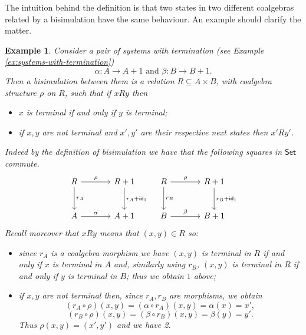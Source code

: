 \documentclass[letterpaper, 11pt, oneside]{memoir}
\theoremstyle{myteo}
\newtheorem{example}[theorem]{Example}
\numberwithin{equation}{section}
\newcommand{\id}{\textsf{id}}
\newcommand{\Set}{\textsf{Set}}
\begin{document}
The intuition behind the definition is that two states in two different coalgebras related by a bisimulation have the same behaviour.
An example should clarify the matter.
\begin{example}
  Consider a pair of systems with termination (see Example \ref{ex:systems-with-termination})
  \begin{equation*}
    \alpha: A \to A + 1 \text{ and } \beta: B \to B + 1.
  \end{equation*}
  Then a bisimulation between them is a relation \(R \subseteq A \times B\), with coalgebra structure \(\rho\) on \(R\), such that if \(x R y\) then
  \begin{itemize}
  \item[1.] \(x\) is terminal if and only if \(y\) is terminal;
  \item[2.] if \(x, y\) are not terminal and \(x', y'\) are their respective next states then \(x' R y'\).
  \end{itemize}
  Indeed by the definition of bisimulation we have that the following squares in \(\Set\) commute.
  \begin{equation}
    \label{dia:fooooo}
    \begin{tikzcd}[sep = large]
      R \ar[r, "\rho"] \ar[d, "r_A"] & R + 1 \ar[d, "r_A + \id_1"] \\
      A \ar[r, "\alpha"] & A + 1
    \end{tikzcd}\quad
    \begin{tikzcd}[sep = large]
      R \ar[r, "\rho"] \ar[d, "r_B"] & R + 1 \ar[d, "r_B + \id_1"] \\
      B \ar[r, "\beta"] & B + 1
    \end{tikzcd}
  \end{equation}
  Recall moreover that \(x R y\) means that \((x, y) \in R\) so:
  \begin{itemize}
  \item[a.] since \(r_A\) is a coalgebra morphism we have \((x, y)\) is terminal in \(R\) if and only if \(x\) is terminal in \(A\) and, similarly using \(r_B\), \((x, y)\) is terminal in \(R\) if and only if \(y\) is terminal in \(B\); thus we obtain \(1\) above;
  \item[b.] if \(x, y\) are not terminal then, since \(r_A, r_B\) are morphisms, we obtain
    \begin{equation*}
      (r_A \circ \rho)(x, y) = (\alpha \circ r_A)(x, y) = \alpha(x) = x',
    \end{equation*}
    \begin{equation*}
      (r_B \circ \rho)(x, y) = (\beta \circ r_B)(x, y) = \beta(y) = y'.
    \end{equation*}
    Thus \(\rho(x, y) = (x', y')\) and we have 2.
  \end{itemize}


\end{example}
\end{document}
